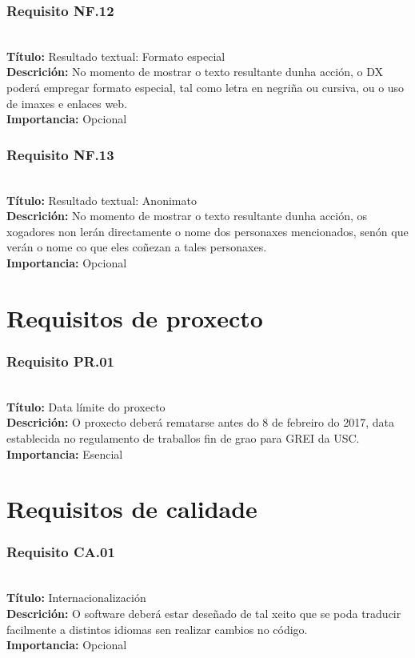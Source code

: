 \subsubsection{Requisito NF.12}~\\
{\bf Título:} Resultado textual: Formato especial\\
{\bf Descrición:} No momento de mostrar o texto resultante dunha acción, o DX
poderá empregar formato especial, tal como letra en negriña ou cursiva, ou o
uso de imaxes e enlaces web.\\
{\bf Importancia:} Opcional

\subsubsection{Requisito NF.13}~\\
{\bf Título:} Resultado textual: Anonimato\\
{\bf Descrición:} No momento de mostrar o texto resultante dunha acción, os
xogadores non lerán directamente o nome dos personaxes mencionados, senón que
verán o nome co que eles coñezan a tales personaxes.\\
{\bf Importancia:} Opcional



\section{Requisitos de proxecto}
\subsubsection{Requisito PR.01}~\\
{\bf Título:} Data límite do proxecto\\
{\bf Descrición:} O proxecto deberá rematarse antes do 8 de febreiro do 2017,
data establecida no regulamento de traballos fin de grao para GREI da USC.\\
{\bf Importancia:} Esencial

\section{Requisitos de calidade}
\subsubsection{Requisito CA.01}~\\
{\bf Título:} Internacionalización\\
{\bf Descrición:} O software deberá estar deseñado de tal xeito que se poda
traducir facilmente a distintos idiomas sen realizar cambios no código.\\
{\bf Importancia:} Opcional

